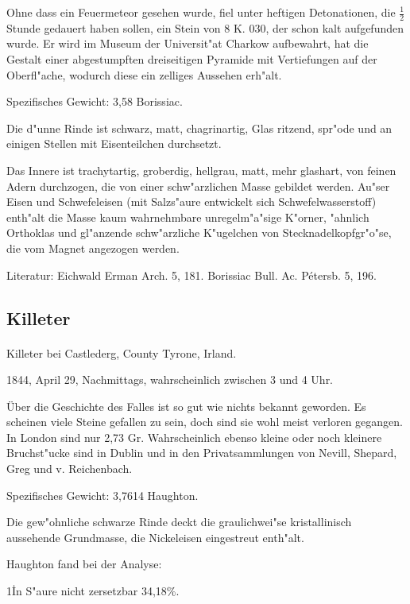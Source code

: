 \documentclass[a4paper, 11pt, oneside]{article}
\begin{document}
Ohne dass ein Feuermeteor gesehen wurde, fiel unter heftigen Detonationen, die $\frac{1}{2}$ Stunde gedauert haben sollen, ein Stein von 8 K. 030, der schon kalt aufgefunden wurde. Er wird im Museum der Universit"at Charkow aufbewahrt, hat die Gestalt einer abgestumpften dreiseitigen Pyramide mit Vertiefungen auf der Oberfl"ache, wodurch diese ein zelliges Aussehen erh"alt.

Spezifisches Gewicht: 3,58 Borissiac.

Die d"unne Rinde ist schwarz, matt, chagrinartig, Glas ritzend, spr"ode und an einigen Stellen mit Eisenteilchen durchsetzt.

Das Innere ist trachytartig, groberdig, hellgrau, matt, mehr glashart, von feinen Adern durchzogen, die von einer schw"arzlichen Masse gebildet werden. Au"ser Eisen und Schwefeleisen (mit Salzs"aure entwickelt sich Schwefelwasserstoff) enth"alt die Masse kaum wahrnehmbare unregelm"a"sige K"orner, "ahnlich Orthoklas und gl"anzende schw"arzliche K"ugelchen von Stecknadelkopfgr"o"se, die vom Magnet angezogen werden.

\footnotesize
Literatur: Eichwald Erman Arch. 5, 181. Borissiac Bull. Ac. Pétersb. 5, 196.

\subsection{Killeter}
\normalsize
\paragraph{}
Killeter bei Castlederg, County Tyrone, Irland.

1844, April 29, Nachmittags, wahrscheinlich zwischen 3 und 4 Uhr.

Über die Geschichte des Falles ist so gut wie nichts bekannt geworden. Es scheinen viele Steine gefallen zu sein, doch sind sie wohl meist verloren gegangen. In London sind nur 2,73 Gr. Wahrscheinlich ebenso kleine oder noch kleinere Bruchst"ucke sind in Dublin und in den Privatsammlungen von Nevill, Shepard, Greg und v. Reichenbach.

Spezifisches Gewicht: 3,7614 Haughton.

Die gew"ohnliche schwarze Rinde deckt die graulichwei"se kristallinisch aussehende Grundmasse, die Nickeleisen eingestreut enth"alt.

Haughton fand bei der Analyse:

1\. In S"aure nicht zersetzbar 34,18\%.
\end{document}
